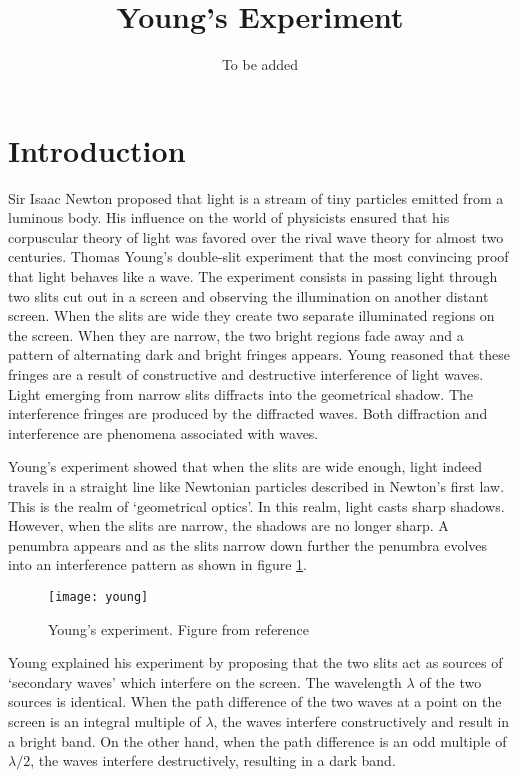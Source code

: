 \documentclass[11pt]{article}
\title{Young's Experiment}
\author{To be added}
\numberwithin{equation}{section}
\begin{document}
\maketitle
\section{Introduction}
Sir Isaac Newton proposed that light is a stream of tiny particles emitted
from a luminous body. His influence on the world of physicists ensured that
his corpuscular theory of light was favored over the rival wave theory for 
almost two centuries. Thomas Young's double-slit experiment that the most
convincing proof that light behaves like a wave. The experiment consists in
passing light through two slits cut out in a screen and observing the 
illumination on another distant screen. When the slits are wide they create
two separate illuminated regions on the screen. When they are narrow, the
two bright regions fade away and a pattern of alternating dark and bright
fringes appears. Young reasoned that these fringes are a result of constructive
and destructive interference of light waves. Light emerging from narrow slits
diffracts into the geometrical shadow. The interference fringes are produced by
the diffracted waves. Both diffraction and interference are phenomena associated
with waves.

Young's experiment showed that when the slits are wide enough, light indeed
travels in a straight line like Newtonian particles described in Newton's first
law. This is the realm of `geometrical optics'. In this realm, light casts
sharp shadows. However, when the slits are narrow, the shadows are no longer
sharp. A penumbra appears and as the slits narrow down further the penumbra 
evolves into an interference pattern as shown in figure \ref{f1}.

\begin{figure}
\centering
\texttt{[image: young]}
\caption{Young's experiment. Figure from reference \cite{wiki1}}\label{f1}
\end{figure}

Young explained his experiment by proposing that the two slits act as sources
of `secondary waves' which interfere on the screen. The wavelength $\lambda$
of the two sources is identical. When the path difference of the two waves
at a point on the screen is an integral multiple of $\lambda$, the waves
interfere constructively and result in a bright band. On the other hand, when
the path difference is an odd multiple of $\lambda/2$, the waves interfere
destructively, resulting in a dark band.
\end{document}
